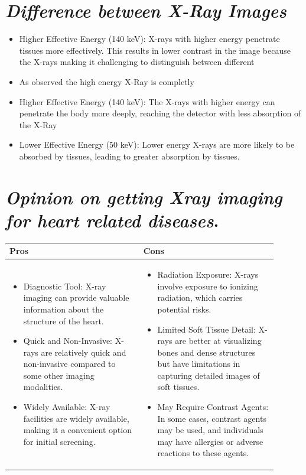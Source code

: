 \documentclass{article}
\begin{document}
\section{\textit{Difference between X-Ray Images}}
\begin{itemize}

\item Higher Effective Energy (140 keV): X-rays with higher energy penetrate tissues more effectively. This  results in lower contrast in the image because the X-rays  making it challenging to distinguish between different
\item As observed the  high energy X-Ray is completly 
\item Higher Effective Energy (140 keV): The X-rays with higher energy can penetrate the body more deeply, reaching the detector with less absorption of the X-Ray
\item Lower Effective Energy (50 keV): Lower energy X-rays are more likely to be absorbed by tissues, leading to greater absorption by tissues. 
\end{itemize}
\newpage
\section{\textit{Opinion on getting Xray imaging for heart related diseases}.}
\begin{table}[h]
  \centering
  \begin{tabular}{|p{0.45\linewidth}|p{0.45\linewidth}|}
    \hline
    \textbf{Pros} & \textbf{Cons} \\
    \hline
    \begin{itemize}
      \item Diagnostic Tool: X-ray imaging can provide valuable information about the structure of the heart.
      \item Quick and Non-Invasive: X-rays are relatively quick and non-invasive compared to some other imaging modalities.
      \item Widely Available: X-ray facilities are widely available, making it a convenient option for initial screening.
    \end{itemize}
    &
    \begin{itemize}
      \item Radiation Exposure: X-rays involve exposure to ionizing radiation, which carries potential risks.
      \item Limited Soft Tissue Detail: X-rays are better at visualizing bones and dense structures but have limitations in capturing detailed images of soft tissues.
      \item May Require Contrast Agents: In some cases, contrast agents may be used, and individuals may have allergies or adverse reactions to these agents.
    \end{itemize} \\
    \hline
  \end{tabular}
\end{table}
\newpage
\end{document}

